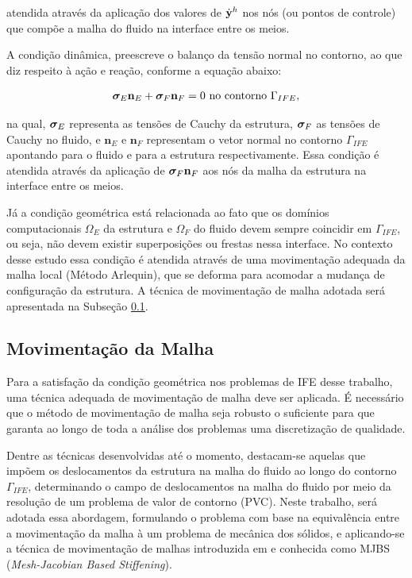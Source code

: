 \documentclass[tese_patricia]{subfiles}
\begin{document}
\noindent atendida através da aplicação dos valores de $\dot{\mathbf{y}}^h$ nos nós (ou pontos de controle) que compõe a malha do fluido na interface entre os meios.

A condição dinâmica, preescreve o balanço da tensão normal no contorno, ao que diz respeito à ação e reação, conforme a equação abaixo:

\begin{align}
	\bm{\sigma}_{E}\mathbf{n}_{E} + \bm{\sigma}_{F}\mathbf{n}_{F} = 0 \ \textrm{no contorno} \ \Gamma_{IFE},
\end{align}

\noindent na qual, $\bm{\sigma}_{E}$ representa as tensões de Cauchy da estrutura, $\bm{\sigma}_{F}$ as tensões de Cauchy no fluido, e $\mathbf{n}_E$ e $\mathbf{n}_F$ representam o vetor normal no contorno $\Gamma_{IFE}$ apontando para o fluido e para a estrutura respectivamente. Essa condição é atendida através da aplicação de $\bm{\sigma}_{F}\mathbf{n}_{F}$ aos nós da malha da estrutura na interface entre os meios.

Já a condição geométrica está relacionada ao fato que os domínios computacionais $\Omega_E$ da estrutura e $\Omega_F$ do fluido devem sempre coincidir em $\Gamma_{IFE}$, ou seja, não devem existir superposições ou frestas nessa interface. No contexto desse estudo essa condição é atendida através de uma movimentação adequada da malha local (Método Arlequin), que se deforma para acomodar a mudança de configuração da estrutura. A técnica de movimentação de malha adotada será apresentada na Subseção \ref{subsec:MovMalha}.

\subsection{Movimentação da Malha} \label{subsec:MovMalha}

Para a satisfação da condição geométrica nos problemas de IFE desse trabalho, uma técnica adequada de movimentação de malha deve ser aplicada. É necessário que o método de movimentação de malha seja robusto o suficiente para que garanta ao longo de toda a análise dos problemas uma discretização de qualidade.

Dentre as técnicas desenvolvidas até o momento, destacam-se aquelas que impõem os deslocamentos da estrutura na malha do fluido ao longo do contorno $\Gamma_{IFE}$, determinando o campo de deslocamentos na malha do fluido por meio da resolução de um problema de valor de contorno (PVC). Neste trabalho, será adotada essa abordagem, formulando o problema com base na equivalência entre a movimentação da malha à um problema de mecânica dos sólidos, e aplicando-se a técnica de movimentação de malhas introduzida em  e  conhecida como MJBS (\textit{Mesh-Jacobian Based Stiffening}).
\end{document}
